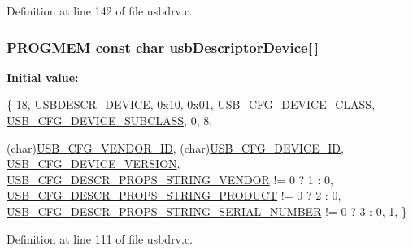Definition at line 142 of file usbdrv.\-c.

\hypertarget{mhvlib-_vusb-_keyboard_2vusb_2usbdrv_8c_a1b8593e30029ecfd59a89335a12db631}{
\subsubsection[{usb\-Descriptor\-Device}]{\setlength{\rightskip}{0pt plus 5cm}P\-R\-O\-G\-M\-E\-M const char usb\-Descriptor\-Device\mbox{[}$\,$\mbox{]}}}\label{mhvlib-_vusb-_keyboard_2vusb_2usbdrv_8c_a1b8593e30029ecfd59a89335a12db631}
{\bfseries Initial value\-:}
\begin{DoxyCode}
 \{    
    18,         
    \hyperlink{mhvlib-_vusb-_keyboard_2vusb_2usbdrv_8h_a5b76593f7b6295a4a599aba4476ec258}{USBDESCR\_DEVICE},        
    0x10, 0x01,             
    \hyperlink{mhvlib-_vusb-_keyboard_2vusb_2usbconfig-prototype_8h_a9ce4f96ad98b3db8205691e8bc723e55}{USB\_CFG\_DEVICE\_CLASS},
    \hyperlink{mhvlib-_vusb-_keyboard_2vusb_2usbconfig-prototype_8h_a89e5ad66f8b835866e7d836c73bfd30d}{USB\_CFG\_DEVICE\_SUBCLASS},
    0,                      
    8,                      
    
    (char)\hyperlink{mhvlib-_vusb-_keyboard_2vusb_2usbconfig-prototype_8h_a9326b8ec9f809ce66d54349691646930}{USB\_CFG\_VENDOR\_ID},
    (\textcolor{keywordtype}{char})\hyperlink{mhvlib-_vusb-_keyboard_2vusb_2usbconfig-prototype_8h_abc740455309399430b0f49bf7931d1d7}{USB\_CFG\_DEVICE\_ID},
    \hyperlink{mhvlib-_vusb-_keyboard_2vusb_2usbconfig-prototype_8h_aba3c7c0cd4055ba3bbf5df38e57b6d27}{USB\_CFG\_DEVICE\_VERSION}, 
    \hyperlink{mhvlib-_vusb-_keyboard_2vusb_2usbdrv_8c_a55edf2117128387162339d98ba2af0f4}{USB\_CFG\_DESCR\_PROPS\_STRING\_VENDOR} != 0 ? 1
       : 0,         
    \hyperlink{mhvlib-_vusb-_keyboard_2vusb_2usbdrv_8c_aa08084f9755a643e02d469b66b129ef6}{USB\_CFG\_DESCR\_PROPS\_STRING\_PRODUCT} != 0 ?
       2 : 0,        
    \hyperlink{mhvlib-_vusb-_keyboard_2vusb_2usbdrv_8c_a82224c07d3a1f9fcccbff70b71c8ea51}{USB\_CFG\_DESCR\_PROPS\_STRING\_SERIAL\_NUMBER}
       != 0 ? 3 : 0,  
    1,          
\}
\end{DoxyCode}


Definition at line 111 of file usbdrv.\-c.


